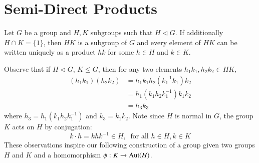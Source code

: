 \documentclass[12pt, a4paper, twoside, openright, titlepage]{book}
\begin{document}
\section{\textsection Semi-Direct Products}

\begin{rec}{}{}
    Let $G$ be a group and $H,K$ subgroups such that $H \vartriangleleft G$. If additionally $H\cap K = \{1\}$, then $HK$ is a subgroup of $G$ and every element of $HK$ can be written uniquely as a product $hk$ for some $h \in H$ and $k \in K$.
\end{rec}

Observe that if $H\vartriangleleft G$, $K \leq G$, then for any two elements $h_1k_1,h_2k_2 \in HK$, \begin{align*}
    (h_1k_1)(h_2k_2) &= h_1k_1h_2(k_1^{-1}k_1)k_2 \\
    &= h_1(k_1h_2k_1^{-1})k_1k_2 \\
    &= h_3k_3
\end{align*}
where $h_3 = h_1(k_1h_2k_1^{-1})$ and $k_3 = k_1k_2$. Note since $H$ is normal in $G$, the group $K$ acts on $H$ by conjugation: \begin{equation*}
    k\cdot h = khk^{-1} \in H,\;\;\text{for all } h\in H,k\in K
\end{equation*}
These observations inspire our following construction of a group given two groups $H$ and $K$ and a homomorphism $\phi:K\rightarrow \operatorname{Aut}(H)$.
\end{document}
